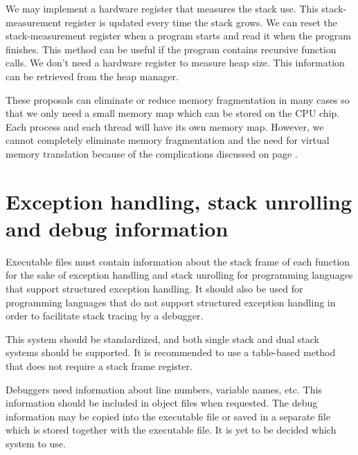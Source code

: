 \documentclass[forwardcom.tex]{subfiles}
\begin{document}
We may implement a hardware register that measures the stack use. This stack-measurement register is updated every time the stack grows. We can reset the stack-measurement register when a program starts and read it when the program finishes. This method can be useful if the program contains recursive function calls. We don't need a hardware register to measure heap size. This information can be retrieved from the heap manager. 
\vspace{2mm}

These proposals can eliminate or reduce memory fragmentation in many cases so that we only need a small memory map which can be stored on the CPU chip. Each process and each thread will have its own memory map. However, we cannot completely eliminate memory fragmentation and the need for virtual memory translation because of the complications discussed on page \pageref{memoryManagement}.

\section{Exception handling, stack unrolling and debug information} \label{exceptionHandling}
Executable files must contain information about the stack frame of each function for the sake of exception handling and stack unrolling for programming languages that support structured exception handling. 
It should also be used for programming languages that do not support structured exception handling in order to facilitate stack tracing by a debugger. 
\vspace{2mm}

This system should be standardized, and both single stack and dual stack systems should be supported. 
It is recommended to use a table-based method that does not require a stack frame register. 
\vspace{2mm}

Debuggers need information about line numbers, variable names, etc. This information should be included in object files when requested. The debug information may be copied into the executable file or saved in a separate file which is stored together with the executable file. It is yet to be decided which system to use. 
\end{document}
